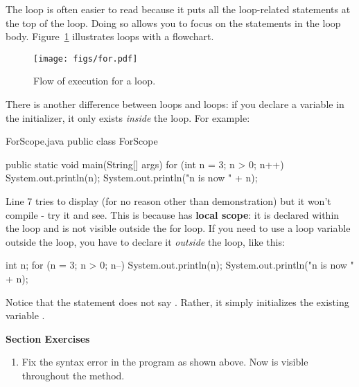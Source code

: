 The  loop is often easier to read because it puts all the loop-related statements at the top of the loop.
Doing so allows you to focus on the statements in the loop body.
Figure~\ref{fig.for} illustrates  loops with a flowchart.

\begin{figure}[!ht]
\begin{center}
\texttt{[image: figs/for.pdf]}
\caption{Flow of execution for a  loop.}
\label{fig.for}
\end{center}
\end{figure}

There is another difference between  loops and  loops: if you declare a variable in the initializer, it only exists {\em inside} the  loop.
For example:

\begin{trinket} [200] {ForScope.java}
public class ForScope {

    public static void main(String[] args) {   
       for (int n = 3; n > 0; n++) {
          System.out.println(n);
       }
       System.out.println("n is now " + n);
    }
}
\end{trinket}

Line 7 tries to display  (for no reason other than demonstration) but it won't compile - try it and see.  This is because  has \textbf{local scope}: it is declared within the  loop and is not visible outside the for loop.
If you need to use a loop variable outside the loop, you have to declare it {\em outside} the loop, like this:

\begin{code}
int n;
for (n = 3; n > 0; n--) {
    System.out.println(n);
}
System.out.println("n is now " + n);
\end{code}

Notice that the  statement does not say .
Rather, it simply initializes the existing variable .

\textbf{Section Exercises}
\begin{enumerate}
\item Fix the syntax error in the program as shown above.  Now  is visible throughout the  method.
\end{enumerate}

